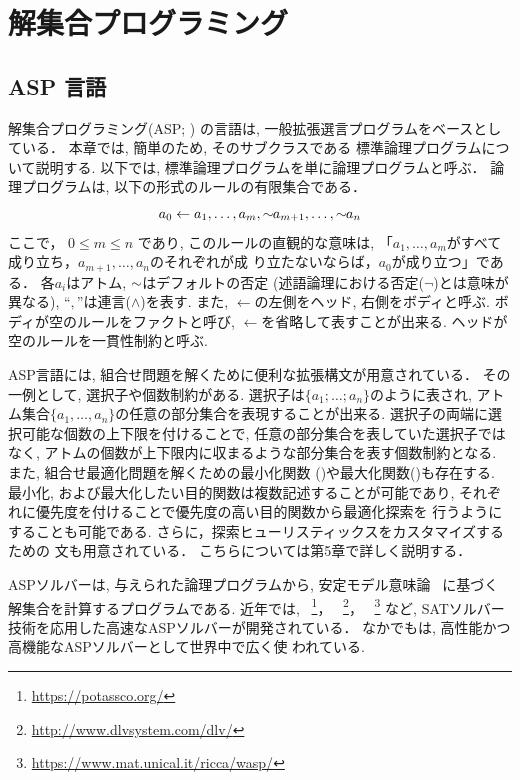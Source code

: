 \chapter{解集合プログラミング}\label{chap:asp}


\section{ASP 言語}
解集合プログラミング(ASP; 
\cite{%
  baral03:cambridge,%
  DBLP:conf/iclp/GelfondL88,%
  DBLP:journals/amai/Niemela99})
の言語は, 一般拡張選言プログラムをベースとしている．
本章では, 簡単のため, そのサブクラスである
標準論理プログラムについて説明する. 
以下では, 標準論理プログラムを単に論理プログラムと呼ぶ．
論理プログラムは, 以下の形式のルールの有限集合である．
\begin{displaymath}
  \label{eq:rule}
  a_0\leftarrow a_1,\dots,a_m,{\sim\!\!{a_{m+1}}},\dots,{\sim\!\!{a_n}}
\end{displaymath}
ここで，
$0\leq m\leq n$ であり, 
このルールの直観的な意味は, 
「$a_1,\ldots,a_m$がすべて成り立ち，$a_{m+1},\ldots,a_n$のそれぞれが成
り立たないならば，$a_0$が成り立つ」である．
各$a_i$はアトム, 
${\sim\!\!{}}$はデフォルトの否定 (述語論理における否定($\neg$)とは意味が異なる), 
``$,$''は連言($\land$)を表す. 
また, $\leftarrow$の左側をヘッド, 右側をボディと呼ぶ. 
ボディが空のルールをファクトと呼び, 
$\leftarrow$を省略して表すことが出来る. 
ヘッドが空のルールを一貫性制約と呼ぶ.

ASP言語には, 組合せ問題を解くために便利な拡張構文が用意されている．
その一例として, 選択子や個数制約がある. 
選択子は\(\{a_1;\dots;a_n\}\)のように表され, アトム集合\(\{a_1,\dots,a_n\}\)の任意の部分集合を表現することが出来る. 
選択子の両端に選択可能な個数の上下限を付けることで, 
任意の部分集合を表していた選択子ではなく, 
アトムの個数が上下限内に収まるような部分集合を表す個数制約となる. 
また, 組合せ最適化問題を解くための最小化関数
()や最大化関数()も存在する. 
最小化, および最大化したい目的関数は複数記述することが可能であり, 
それぞれに優先度を付けることで優先度の高い目的関数から最適化探索を
行うようにすることも可能である. 
さらに，探索ヒューリスティックスをカスタマイズするための 
文も用意されている．
こちらについては第5章で詳しく説明する．

ASPソルバーは, 与えられた論理プログラムから, 
安定モデル意味論~\cite{DBLP:conf/iclp/GelfondL88}
に基づく解集合を計算するプログラムである. 
近年では, 
{\clingo}~\footnote{\url{https://potassco.org/}}，
{\dlv}~\footnote{\url{http://www.dlvsystem.com/dlv/}}，
{\wasp}~\footnote{\url{https://www.mat.unical.it/ricca/wasp/}}
など, SATソルバー技術を応用した高速なASPソルバーが開発されている．
なかでも{\clingo}は, 高性能かつ高機能なASPソルバーとして世界中で広く使
われている. 

